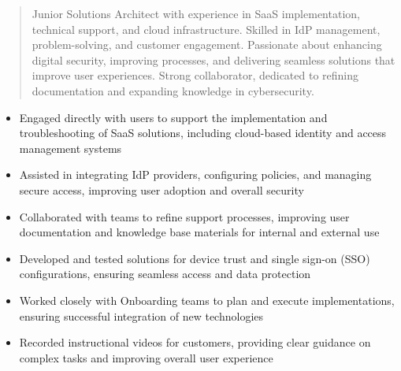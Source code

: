 



\makecvheader

\begin{quote}
  \noindent
  Junior Solutions Architect with experience in SaaS implementation, technical support, and cloud infrastructure. Skilled in IdP management, problem-solving, and customer engagement. Passionate about enhancing digital security, improving processes, and delivering seamless solutions that improve user experiences. Strong collaborator, dedicated to refining documentation and expanding knowledge in cybersecurity.
\end{quote}

\par\smallskip
\noindent
\begin{minipage}{20cm}
  \begin{minipage}{9.75cm}
    \begin{itemize}
      \item Engaged directly with users to support the implementation and troubleshooting of SaaS solutions, including cloud-based identity and access management systems
      \item Assisted in integrating IdP providers, configuring policies, and managing secure access, improving user adoption and overall security
      \item Collaborated with teams to refine support processes, improving user documentation and knowledge base materials for internal and external use
    \end{itemize}
  \end{minipage}
  \hfill
  \begin{minipage}{9.75cm}
    \begin{itemize}
      \item Developed and tested solutions for device trust and single sign-on (SSO) configurations, ensuring seamless access and data protection
      \item Worked closely with Onboarding teams to plan and execute implementations, ensuring successful integration of new technologies
      \item Recorded instructional videos for customers, providing clear guidance on complex tasks and improving overall user experience
    \end{itemize}
  \end{minipage}
\end{minipage}
\par\smallskip
\divider

